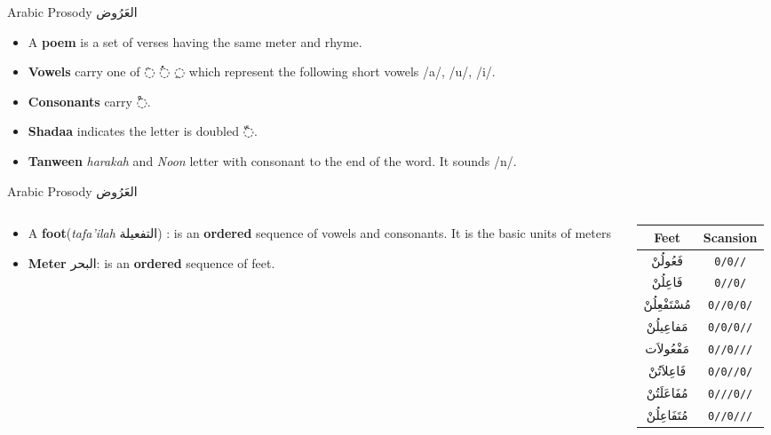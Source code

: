 \begin{frame}[fragile]{Arabic Prosody \textarabic{العَرُوض}}

\begin{itemize}
	\item<1-> A \textbf{poem } is a set of verses having the same meter and rhyme.
	\item<2-> \textbf{Vowels}  carry one of \textarabic{◌َ  ◌ُ  ◌ِ} which represent the following short vowels /a/, /u/, /i/.
	\item<3-> \textbf{Consonants} carry \textarabic{◌ْ}.
	\item<4-> \textbf{Shadaa} indicates the letter is doubled \textarabic{◌ّ}. 
	\item<5-> \textbf{Tanween} \textit{harakah} and \textit{Noon} letter with consonant to the end of the word. It sounds /n/.
\end{itemize}

\end{frame}

\begin{frame}[fragile]{Arabic Prosody \textarabic{العَرُوض}}

\begin{columns}
	\begin{column}{0.6\textwidth}
		
		\begin{itemize}
			\item A \textbf{foot}(\textit{tafa'ilah} \textarabic{التفعيلة}) : is an \textbf{ordered} sequence of vowels and consonants. 
			It is the basic units of meters
			\item \textbf{Meter} \textarabic{البحر}: is an \textbf{ordered} sequence of \alert{feet}. 
		\end{itemize}
		
	\end{column}
	
	\begin{column}{0.5\textwidth}
		\begin{center}
			\begin{tabular}{|c|c|} \hline
				\textbf{Feet} & \textbf{Scansion} \\
				\hline
				\textarabic{فَعُولُنْ}  & \texttt{0/0//}\\
				\textarabic{فَاعِلُنْ}  & \texttt{0//0/}\\
				\textarabic{مُسْتَفْعِلُنْ}& \texttt{0//0/0/}\\
				\textarabic{مَفاعِيلُنْ}& \texttt{0/0/0//}\\
				\textarabic{مَفْعُولاَت} & \texttt{0//0///}\\
				\textarabic{فَاعِلاَتُنْ} & \texttt{0/0//0/}\\
				\textarabic{مُفَاعَلَتُنْ}& \texttt{0///0//}\\
				\textarabic{مُتَفَاعِلُنْ}& \texttt{0//0///}\\
				\hline
			\end{tabular}
		\end{center}
	\end{column}
\end{columns}
\end{frame}

